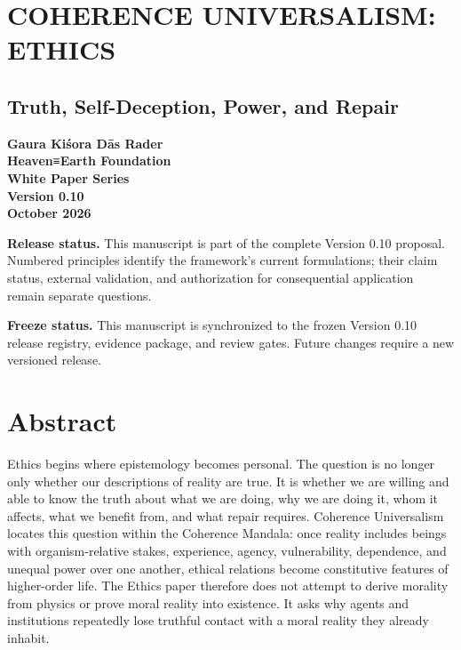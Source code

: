 \documentclass[
  11pt,
]{article}
\author{}
\date{}
\begin{document}
\section{COHERENCE UNIVERSALISM:
ETHICS}\label{coherence-universalism-ethics}

\subsection{Truth, Self-Deception, Power, and
Repair}\label{truth-self-deception-power-and-repair}

\textbf{Gaura Kiśora Dās Rader}\\
\textbf{Heaven≡Earth Foundation}\\
\textbf{White Paper Series}\\
\textbf{Version 0.10}\\
\textbf{October 2026}

\textbf{Release status.} This manuscript is part of the complete Version
0.10 proposal. Numbered principles identify the framework's current
formulations; their claim status, external validation, and authorization
for consequential application remain separate questions.

\textbf{Freeze status.} This manuscript is synchronized to the frozen
Version 0.10 release registry, evidence package, and review gates.
Future changes require a new versioned release.

\section{Abstract}\label{abstract}

Ethics begins where epistemology becomes personal. The question is no
longer only whether our descriptions of reality are true. It is whether
we are willing and able to know the truth about what we are doing, why
we are doing it, whom it affects, what we benefit from, and what repair
requires. Coherence Universalism locates this question within the
Coherence Mandala: once reality includes beings with organism-relative
stakes, experience, agency, vulnerability, dependence, and unequal power
over one another, ethical relations become constitutive features of
higher-order life. The Ethics paper therefore does not attempt to derive
morality from physics or prove moral reality into existence. It asks why
agents and institutions repeatedly lose truthful contact with a moral
reality they already inhabit.
\end{document}
